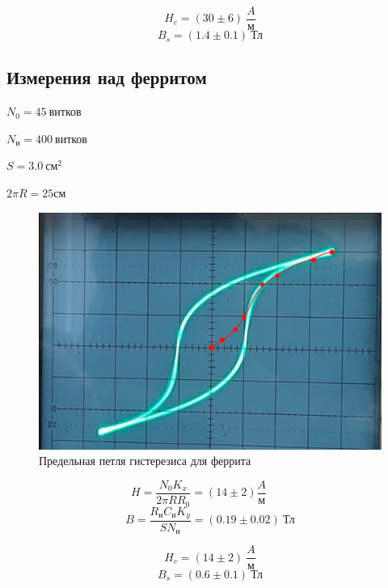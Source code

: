 \documentclass[a4paper]{article}
\begin{document}
\begin{equation*}
    H_c = (30 \pm 6) \ \frac{A}{\text{м}}
\end{equation*}
\begin{equation*}
    B_s = (1.4 \pm 0.1) \ \text{Тл}
\end{equation*}

\newpage

\subsection{Измерения над ферритом}
$N_0 = 45 \ \text{витков}$

$N_\text{и} = 400 \ \text{витков}$

$S = 3.0 \ \text{см}^2$

$2 \pi R = 25 \text{см}$

\begin{figure}[h!]
    \centering
    \includegraphics[width=0.5\pdfpagewidth]{11.jpg}
    \caption{Предельная петля гистерезиса для феррита}
\end{figure}

\begin{equation*}
    H = \frac{N_0 K_x}{2\pi RR_0} = (14 \pm 2) \frac{A}{\text{м}} \qquad 
\end{equation*}
\begin{equation*}
    B = \frac{R_\text{и} C_\text{и} K_y}{S N_\text{и}} = (0.19 \pm 0.02) \ \text{Тл}
\end{equation*}

\begin{equation*}
    H_c = (14 \pm 2) \ \frac{A}{\text{м}}
\end{equation*}
\begin{equation*}
    B_s = (0.6 \pm 0.1) \ \text{Тл}
\end{equation*}
\end{document}
